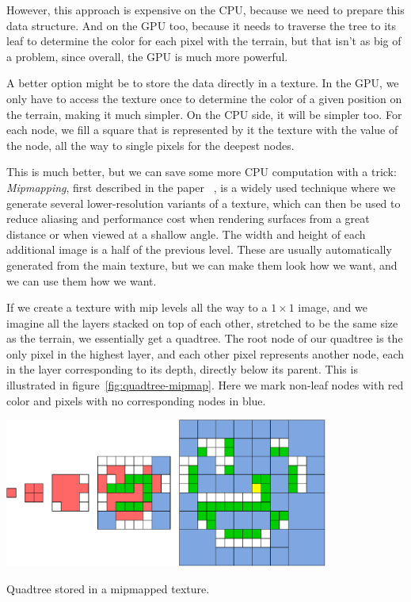 However, this approach is expensive on the CPU, because we need to prepare this data structure.
And on the GPU too, because it needs to traverse the tree to its leaf to determine the color for each pixel with the terrain, but that isn't as big of a problem, since overall, the GPU is much more powerful.

A better option might be to store the data directly in a texture.
In the GPU, we only have to access the texture once to determine the color of a given position on the terrain, making it much simpler.
On the CPU side, it will be simpler too.
For each node, we fill a square that is represented by it the texture with the value of the node, all the way to single pixels for the deepest nodes.

This is much better, but we can save some more CPU computation with a trick:
\emph{Mipmapping}, first described in the paper ~\cite{Mipmaps}, is a widely used technique where we generate several lower-resolution variants of a texture, which can then be used to reduce aliasing and performance cost when rendering surfaces from a great distance or when viewed at a shallow angle.
The width and height of each additional image is a half of the previous level.
These are usually automatically generated from the main texture, but we can make them look how we want, and we can use them how we want.

If we create a texture with mip levels all the way to a $1 \times 1$ image, and we imagine all the layers stacked on top of each other, stretched to be the same size as the terrain, we essentially get a quadtree.
The root node of our quadtree is the only pixel in the highest layer, and each other pixel represents another node, each in the layer corresponding to its depth, directly below its parent.
This is illustrated in figure~\ref{fig:quadtree-mipmap}.
Here we mark non-leaf nodes with red color and pixels with no corresponding nodes in blue.

\begin{center}
    \captionsetup{type=figure}
    \includegraphics[width=0.8\textwidth]{img/quadtree mipmaps.pdf}
    \caption{Quadtree stored in a mipmapped texture.}
    \label{fig:quadtree-mipmap}
\end{center}

